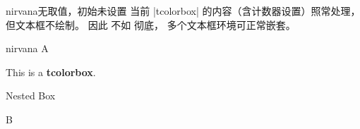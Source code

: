\begin{docTcbKey}[][doc new=2019-03-01]{nirvana}{}{无取值，初始未设置}
  当前 |tcolorbox| 的内容（含计数器设置）照常处理，
  但文本框不绘制。
  因此  不如  彻底，
  多个文本框环境可正常嵌套。

\begin{exdispExample}{nirvana}
A%
  \begin{tcolorbox}[
      title=This box is completely removed by the following key,
      nirvana
    ]
  This is a \textbf{tcolorbox}.
    \begin{tcolorbox}
    Nested Box
    \end{tcolorbox}
  \end{tcolorbox}%
B
\end{exdispExample}
\end{docTcbKey}
